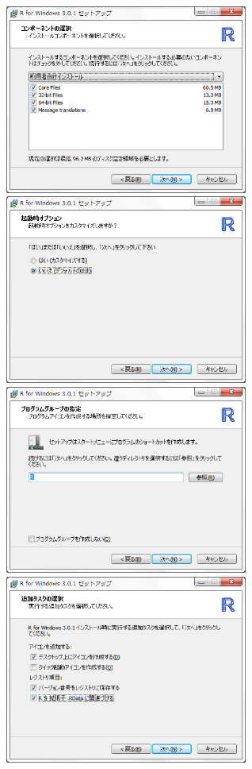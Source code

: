 \includegraphics[width=8cm]{img/windows/win006.eps}\hspace{0.8em} \includegraphics[width=8cm]{img/windows/win007.eps}\\

\includegraphics[width=8cm]{img/windows/win008.eps}\hspace{0.8em} \includegraphics[width=8cm]{img/windows/win009.eps}\\

